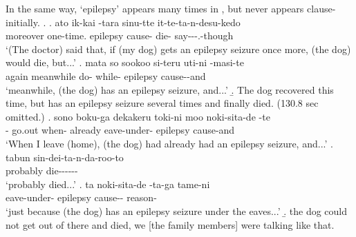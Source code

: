 In the same way,
 `epilepsy' appears many times in \Next,
but never appears clause-initially.
%
\ex.\label{WO:ClauseInit:Given:tenkan}
 \ag. ato ik-kai  -tara sinu-tte it-te-ta-n-desu-kedo \\
      moreover one-time. epilepsy cause- die- say---.-though \\
      `(The doctor) said that, if (my dog) gets an epilepsy seizure once more, (the dog) would die, but...'
 \bg. mata so sookoo si-teru uti-ni  -masi-te \\
      again  meanwhile do- while- epilepsy cause--and \\
      `meanwhile, (the dog) has an epilepsy seizure, and...'
 \b. The dog recovered this time, but has an epilepsy seizure several times and finally died. (130.8 sec omitted.)
 \bg. sono boku-ga dekakeru toki-ni moo noki-sita-de  -te \\
       - go.out when- already eave-under- epilepsy cause-and \\
      `When I leave (home), (the dog) had already had an epilepsy seizure, and...'
 \bg. tabun sin-dei-ta-n-da-roo-to \\
      probably die------\\
      `probably died...'
 \bg. ta noki-sita-de  -ta-ga tame-ni \\
       eave-under- epilepsy cause-- reason- \\
      `just because (the dog) has an epilepsy seizure under the eaves...'
 \b. the dog could not get out of there and died, we [the family members] were talking like that.


